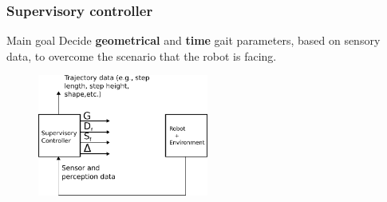 \documentclass[10pt]{beamer}
\begin{document}
\begin{frame}\frametitle{Supervisory controller}
	\begin{block}{Main goal}
		\Large Decide \textbf{geometrical} and \textbf{time} gait parameters, based on sensory data, to overcome the scenario that the robot is facing.
	\end{block}
	\begin{figure}[ht]\centering
		\includegraphics[width=0.5\textwidth]{images/Supervisory0.pdf}
	\end{figure}
\end{frame}
\end{document}
